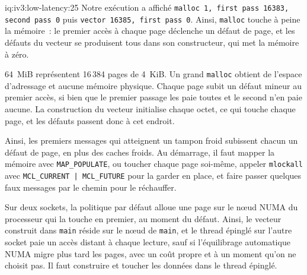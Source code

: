 \begin{solution}{iq:iv3:low-latency:25}
Notre exécution a affiché \texttt{malloc 1, first pass 16383, second pass 0} puis \texttt{vector 16385, first pass 0}. Ainsi, \texttt{malloc} touche à peine la mémoire~: le premier accès à chaque page déclenche un défaut de page, et les défauts du vecteur se produisent tous dans son constructeur, qui met la mémoire à zéro.

64~MiB représentent 16\,384 pages de 4~KiB. Un grand \texttt{malloc} obtient de l'espace d'adressage et aucune mémoire physique. Chaque page subit un défaut mineur au premier accès, si bien que le premier passage les paie toutes et le second n'en paie aucune. La construction du vecteur initialise chaque octet, ce qui touche chaque page, et les défauts passent donc à cet endroit.

Ainsi, les premiers messages qui atteignent un tampon froid subissent chacun un défaut de page, en plus des caches froids. Au démarrage, il faut mapper la mémoire avec \texttt{MAP\_POPULATE}, ou toucher chaque page soi-même, appeler \texttt{mlockall} avec \texttt{MCL\_CURRENT | MCL\_FUTURE} pour la garder en place, et faire passer quelques faux messages par le chemin pour le réchauffer.

Sur deux sockets, la politique par défaut alloue une page sur le nœud NUMA du processeur qui la touche en premier, au moment du défaut. Ainsi, le vecteur construit dans \texttt{main} réside sur le nœud de \texttt{main}, et le thread épinglé sur l'autre socket paie un accès distant à chaque lecture, sauf si l'équilibrage automatique NUMA migre plus tard les pages, avec un coût propre et à un moment qu'on ne choisit pas. Il faut construire et toucher les données dans le thread épinglé.

\end{solution}

